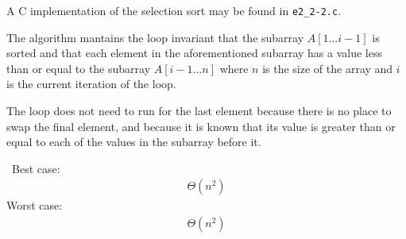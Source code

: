 A C implementation of the selection sort may be found in \texttt{e2\_2-2.c}.

The algorithm mantains the loop invariant that the subarray $A[1 \ldots i-1]$ is sorted and that each element in the aforementioned subarray has a value less than or equal to the subarray $A[i-1 \ldots n]$ where $n$ is the size of the array and $i$ is the current iteration of the loop.

The loop does not need to run for the last element because there is no place to swap the final element, and because it is known that its value is greater than or equal to each of the values in the subarray before it.

\noindent~Best case:
\begin{eqnarray*}
	\Theta(n^2)
\end{eqnarray*}
Worst case:
\begin{eqnarray*}
	\Theta(n^2)
\end{eqnarray*}
